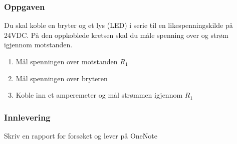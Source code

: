 \documentclass[12pt,a4paper]{article}
\begin{document}
\subsubsection*{Oppgaven}

Du skal koble en bryter og et lys (LED) i serie til en likespenningskilde
på 24VDC. På den oppkoblede kretsen skal du måle spenning over og strøm igjennom motstanden. 

\begin{enumerate}
\item Mål spenningen over motstanden $R_{1}$
\item Mål spenningen over bryteren 
\item Koble inn et amperemeter og mål strømmen igjennom $R_{1}$ 
\end{enumerate}

\subsubsection*{Innlevering}

Skriv en rapport for forsøket og lever på OneNote
\end{document}
